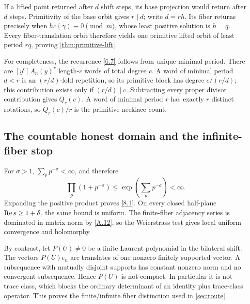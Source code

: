 If a lifted point returned after \(d\) shift steps, its base projection would
return after \(d\) steps.  Primitivity of the base orbit gives \(r\mid d\);
write \(d=rh\).  Its fiber returns precisely when
\(hc(\gamma)\equiv0\pmod m\), whose least positive solution is \(h=q\).
Every fiber-translation orbit therefore yields one primitive lifted orbit of
least period \(rq\), proving \cref{thm:primitive-lift}.

For completeness, the recurrence \eqref{6.7} follows from unique minimal
period.  There are \([y^c]A_n(y)^r\) length-\(r\) words of total degree
\(c\).  A word of minimal period \(d<r\) is an \((r/d)\)-fold repetition, so
its primitive block has degree \(c/(r/d)\); this contribution exists only if
\((r/d)\mid c\).  Subtracting every proper divisor contribution gives
\(Q_r(c)\).  A word of minimal period \(r\) has exactly \(r\) distinct
rotations, so \(Q_r(c)/r\) is the primitive-necklace count.

\subsection{The countable honest domain and the infinite-fiber stop}

For \(\sigma>1\), \(\sum_pp^{-\sigma}<\infty\), and therefore
\[
\prod_p(1+p^{-\sigma})
\le \exp\!\left(\sum_pp^{-\sigma}\right)<\infty.
\tag{A.12}\label{A.12}
\]
Expanding the positive product proves \eqref{8.1}.  On every closed half-plane
\(\operatorname{Re} s\ge1+\delta\), the same bound is uniform.  The finite-fiber adjacency
series is dominated in matrix norm by \eqref{A.12}, so the Weierstrass test
gives local uniform convergence and holomorphy.

By contrast, let \(P(U)\ne0\) be a finite Laurent polynomial in the bilateral
shift.  The vectors \(P(U)e_n\) are translates of one nonzero finitely
supported vector.  A subsequence with mutually disjoint supports has constant
nonzero norm and no convergent subsequence.  Hence \(P(U)\) is not compact.
In particular it is not trace class, which blocks the ordinary determinant
of an identity plus trace-class operator.  This proves the finite/infinite
fiber distinction used in \cref{sec:route}.
